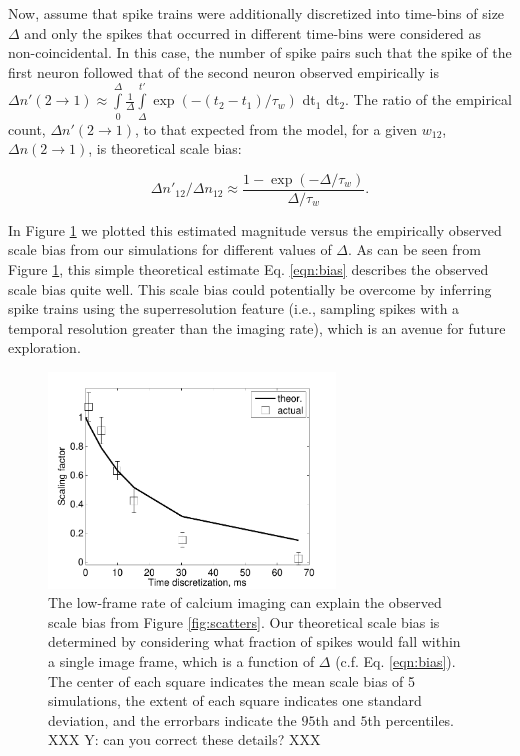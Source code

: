 Now, assume that spike trains were additionally discretized into time-bins of size $\Delta$ and only the spikes that occurred in different time-bins were considered as non-coincidental. In this case, the number of spike pairs such that the spike of the first neuron followed that of the second neuron observed empirically is $\Delta n'(2\rightarrow 1) \approx \int\limits_0^\Delta \frac{1}{\Delta} \int\limits_{\Delta}^{t'} \exp(-(t_2-t_1)/\tau_w)$ dt$_1$ dt$_2$. The ratio of the empirical count, $\Delta n'(2\rightarrow 1)$, to that expected from the model, for a given $w_{12}$, $\Delta n(2\rightarrow 1)$, is theoretical scale bias:

\begin{equation}\label{eqn:bias}
\Delta n'_{12}/\Delta n_{12}\approx \frac{1-\exp(-\Delta/\tau_w)}{\Delta/\tau_w}.
\end{equation}

In Figure \ref{fig:bias} we plotted this estimated magnitude versus the empirically observed scale bias from our simulations for different values of $\Delta$. As can be seen from Figure \ref{fig:bias}, this simple theoretical estimate Eq. \ref{eqn:bias} describes the observed scale bias quite well.  This scale bias could potentially be overcome by inferring spike trains using the superresolution feature \cite{VogPan09} (i.e., sampling spikes with a temporal resolution greater than the imaging rate), which is an avenue for future exploration.

\begin{figure}[h]
\centering
\includegraphics[width=3in]{../figs/FigureA4_scale_bias}
\caption{The low-frame rate of calcium imaging can explain the observed scale bias from Figure \ref{fig:scatters}.  Our theoretical scale bias is determined by considering what fraction of spikes would fall within a single image frame, which is a function of $\Delta$ (c.f. Eq. \ref{eqn:bias}).  The center of each square indicates the mean scale bias of 5 simulations, the extent of each square indicates one standard deviation, and the errorbars indicate the $95$th and $5$th percentiles. XXX Y: can you correct these details? XXX}
\label{fig:bias}
\end{figure}


